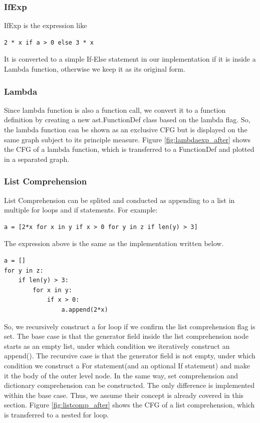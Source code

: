 \documentclass[11pt]{article}
\begin{document}
\subsubsection{IfExp}
IfExp is the expression like
\begin{lstlisting}
2 * x if a > 0 else 3 * x
\end{lstlisting}
It is converted to a simple If-Else statement in our implementation if it is inside a Lambda function, otherwise we keep it as its original form.

\subsubsection{Lambda}
Since lambda function is also a function call, we convert it to a function definition by creating a new ast.FunctionDef class based on the lambda flag. So, the lambda function can be shown as an exclusive CFG but is displayed on the same graph subject to its principle measure. Figure \ref{fig:lambdaexp_after} shows the CFG of a lambda function, which is transferred to a FunctionDef and plotted in a separated graph.

\subsubsection{List Comprehension}
List Comprehension can be splited and conducted as appending to a list in multiple for loops and if statements. For example:
\begin{lstlisting}
a = [2*x for x in y if x > 0 for y in z if len(y) > 3]
\end{lstlisting}
The expression above is the same as the implementation written below.
\begin{lstlisting}
a = []
for y in z:
    if len(y) > 3:
        for x in y:
            if x > 0:
                a.append(2*x)
\end{lstlisting}
So, we recursively construct a for loop if we confirm the list comprehension flag is set. The base case is that the generator field inside the list comprehension node starts as an empty list, under which condition we iteratively construct an append(). The recursive case is that the generator field is not empty, under which condition we construct a For statement(and an optional If statement) and make it the body of the outer level node. In the same way, set comprehension and dictionary comprehension can be constructed. The only difference is implemented within the base case. Thus, we assume their concept is already covered in this section. Figure \ref{fig:listcomp_after} shows the CFG of a list comprehension, which is transferred to a nested for loop.
\end{document}
